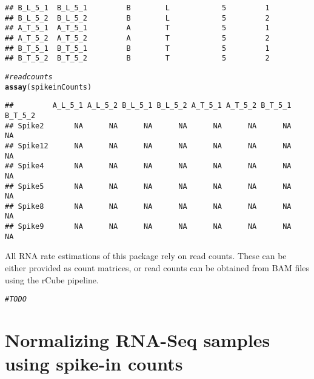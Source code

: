 \documentclass{article}\usepackage[]{graphicx}\usepackage[usenames,dvipsnames]{color}
\makeatletter
\newcommand{\hlcom}[1]{\textcolor[rgb]{0.678,0.584,0.686}{\textit{#1}}}%
\newcommand{\hlstd}[1]{\textcolor[rgb]{0.345,0.345,0.345}{#1}}%
\newcommand{\hlkwd}[1]{\textcolor[rgb]{0.737,0.353,0.396}{\textbf{#1}}}%
\newenvironment{kframe}{%
 \def\at@end@of@kframe{}%
 \ifinner\ifhmode%
  \def\at@end@of@kframe{\end{minipage}}%
  \begin{minipage}{\columnwidth}%
 \fi\fi%
 \def\FrameCommand##1{\hskip\@totalleftmargin \hskip-\fboxsep
 \colorbox{shadecolor}{##1}\hskip-\fboxsep
     \hskip-\linewidth \hskip-\@totalleftmargin \hskip\columnwidth}%
 \MakeFramed {\advance\hsize-\width
   \@totalleftmargin\z@ \linewidth\hsize
   \@setminipage}}%
 {\par\unskip\endMakeFramed%
 \at@end@of@kframe}
\newenvironment{knitrout}{}{} %
\makeatother
\begin{document}
\begin{knitrout}
\begin{kframe}
\begin{verbatim}
## B_L_5_1  B_L_5_1         B        L            5         1
## B_L_5_2  B_L_5_2         B        L            5         2
## A_T_5_1  A_T_5_1         A        T            5         1
## A_T_5_2  A_T_5_2         A        T            5         2
## B_T_5_1  B_T_5_1         B        T            5         1
## B_T_5_2  B_T_5_2         B        T            5         2
\end{verbatim}
\begin{alltt}
\hlcom{# read counts}
\hlkwd{assay}\hlstd{(spikeinCounts)}
\end{alltt}
\begin{verbatim}
##         A_L_5_1 A_L_5_2 B_L_5_1 B_L_5_2 A_T_5_1 A_T_5_2 B_T_5_1 B_T_5_2
## Spike2       NA      NA      NA      NA      NA      NA      NA      NA
## Spike12      NA      NA      NA      NA      NA      NA      NA      NA
## Spike4       NA      NA      NA      NA      NA      NA      NA      NA
## Spike5       NA      NA      NA      NA      NA      NA      NA      NA
## Spike8       NA      NA      NA      NA      NA      NA      NA      NA
## Spike9       NA      NA      NA      NA      NA      NA      NA      NA
\end{verbatim}
\end{kframe}
\end{knitrout}

All RNA rate estimations of this package rely on read counts. These can be either
provided as count matrices, or read counts can be obtained from BAM files using
the rCube pipeline.
\begin{knitrout}
\color{fgcolor}\begin{kframe}
\begin{alltt}
\hlcom{#TODO }
\end{alltt}
\end{kframe}
\end{knitrout}





\section{Normalizing RNA-Seq samples using spike-in counts} \label{Normalization}
\end{document}
